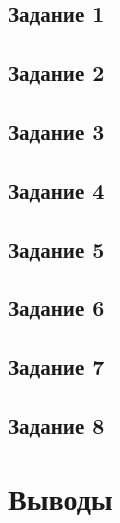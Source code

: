 \documentclass[a4paper,12pt]{article}
\begin{document}
\subsection{Задание 1}


\subsection{Задание 2}


\subsection{Задание 3}


\subsection{Задание 4}


\subsection{Задание 5}


\subsection{Задание 6}


\subsection{Задание 7}


\subsection{Задание 8}


\section{Выводы}
\end{document}
